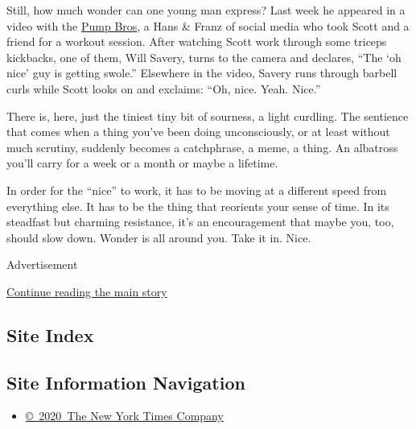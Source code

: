 Still, how much wonder can one young man express? Last week he appeared
in a video with the
\href{https://www.youtube.com/watch?v=YJdZQb8VOZk}{Pump Bros}, a Hans \&
Franz of social media who took Scott and a friend for a workout session.
After watching Scott work through some triceps kickbacks, one of them,
Will Savery, turns to the camera and declares, ``The `oh nice' guy is
getting swole.'' Elsewhere in the video, Savery runs through barbell
curls while Scott looks on and exclaims: ``Oh, nice. Yeah. Nice.''

There is, here, just the tiniest tiny bit of sourness, a light curdling.
The sentience that comes when a thing you've been doing unconsciously,
or at least without much scrutiny, suddenly becomes a catchphrase, a
meme, a thing. An albatross you'll carry for a week or a month or maybe
a lifetime.

In order for the ``nice'' to work, it has to be moving at a different
speed from everything else. It has to be the thing that reorients your
sense of time. In its steadfast but charming resistance, it's an
encouragement that maybe you, too, should slow down. Wonder is all
around you. Take it in. Nice.

Advertisement

\protect\hyperlink{after-bottom}{Continue reading the main story}

\hypertarget{site-index}{%
\subsection{Site Index}\label{site-index}}

\hypertarget{site-information-navigation}{%
\subsection{Site Information
Navigation}\label{site-information-navigation}}

\begin{itemize}
\tightlist
\item
  \href{https://help.nytimes3xbfgragh.onion/hc/en-us/articles/115014792127-Copyright-notice}{©~2020~The
  New York Times Company}
\end{itemize}

